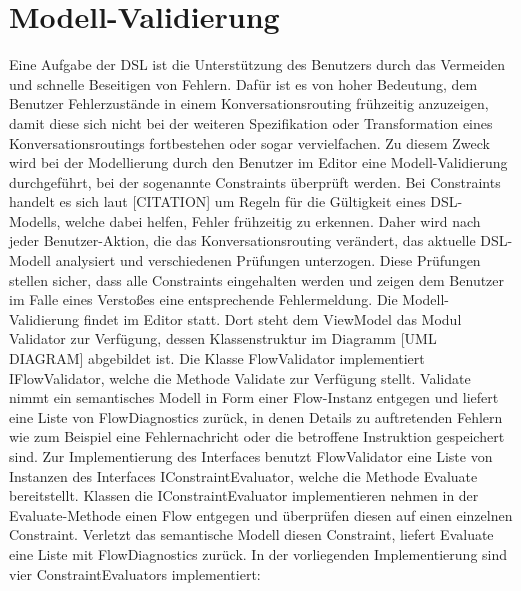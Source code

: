 \section{Modell-Validierung} 
Eine Aufgabe der DSL ist die Unterstützung des Benutzers durch das Vermeiden und schnelle Beseitigen von Fehlern. Dafür ist es von hoher Bedeutung, dem Benutzer Fehlerzustände in einem Konversationsrouting frühzeitig anzuzeigen, damit diese sich nicht bei der weiteren Spezifikation oder Transformation eines Konversationsroutings fortbestehen oder sogar vervielfachen. Zu diesem Zweck wird bei der Modellierung durch den Benutzer im Editor eine Modell-Validierung durchgeführt, bei der sogenannte Constraints überprüft werden. Bei Constraints handelt es sich laut [CITATION] um Regeln für die Gültigkeit eines DSL-Modells, welche dabei helfen, Fehler frühzeitig zu erkennen. Daher wird nach jeder Benutzer-Aktion, die das Konversationsrouting verändert, das aktuelle DSL-Modell analysiert und verschiedenen Prüfungen unterzogen. Diese Prüfungen stellen sicher, dass alle Constraints eingehalten werden und zeigen dem Benutzer im Falle eines Verstoßes eine entsprechende Fehlermeldung.
\newline
Die Modell-Validierung findet im Editor statt. Dort steht dem ViewModel das Modul Validator zur Verfügung, dessen Klassenstruktur im Diagramm [UML DIAGRAM] abgebildet ist. Die Klasse FlowValidator implementiert IFlowValidator, welche die Methode Validate zur Verfügung stellt. Validate nimmt ein semantisches Modell in Form einer Flow-Instanz entgegen und liefert eine Liste von FlowDiagnostics zurück, in denen Details zu auftretenden Fehlern wie zum Beispiel eine Fehlernachricht oder die betroffene Instruktion gespeichert sind. Zur Implementierung des Interfaces benutzt FlowValidator eine Liste von Instanzen des Interfaces IConstraintEvaluator, welche die Methode Evaluate bereitstellt. Klassen die IConstraintEvaluator implementieren nehmen in der Evaluate-Methode einen Flow entgegen und überprüfen diesen auf einen einzelnen Constraint. Verletzt das semantische Modell diesen Constraint, liefert Evaluate eine Liste mit FlowDiagnostics zurück. In der vorliegenden Implementierung sind vier ConstraintEvaluators implementiert: 
